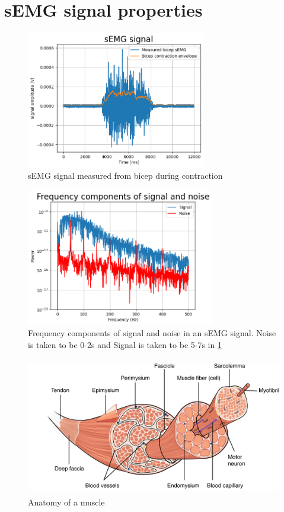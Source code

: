 \section{sEMG signal properties}

\begin{figure}[h!t]
	\begin{center}
		\includegraphics[height=60mm]{images/sEMG_signal_example.png}
	\end{center}
	\caption{sEMG signal measured from bicep during contraction}
	\label{fig:sEMG_signal_example}
\end{figure}

\begin{figure}[h!t]
	\begin{center}
		\includegraphics[height=60mm]{images/sEMG_fft_signalnoise_example.png}
	\end{center}
	\caption{Frequency components of signal and noise in an sEMG signal. 
    Noise is taken to be 0-2s and Signal is taken to be 5-7s in \ref{fig:sEMG_signal_example}}
	\label{fig:sEMG_fft_signalnoise_example}
\end{figure}

\begin{figure}[h!t]
	\begin{center}
		\includegraphics[height=60mm]{images/muscle_anatomy.png}
	\end{center}
	\caption{Anatomy of a muscle \cite{muscle_anatomy}}
	\label{fig:muscle_anatomy}
\end{figure}

